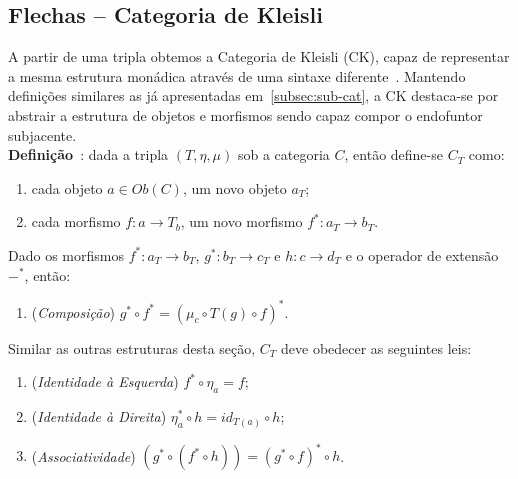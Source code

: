 \documentclass[10pt, conference]{IEEEtran}
\begin{document}
\subsection{Flechas -- Categoria de Kleisli}
\label{subsec:arrow}
A partir de uma tripla obtemos a Categoria de Kleisli (CK), capaz de representar a mesma estrutura monádica através de uma sintaxe diferente~\cite{hill1994introduction}. Mantendo definições similares as já apresentadas em~\ref{subsec:sub-cat}, a CK destaca-se por abstrair a estrutura de objetos e morfismos sendo capaz compor o endofuntor subjacente.\\

\textbf{Definição}~\cite{maclane1971mat, pedicchio2004categorical, hill1994introduction}: dada a tripla $(T, \eta, \mu)$ sob a categoria $C$, então define-se $C_T$ como:

\begin{enumerate}[label=(\alph*), leftmargin=3em, topsep = 0pt, itemsep = 1ex, partopsep = 1ex, parsep = 1ex]
	\item cada objeto $a \in Ob(C)$, um novo objeto $a_T$;
	\item cada morfismo $f: a \rightarrow T_b$, um novo morfismo ${f^*: a_T \rightarrow b_T}$.
\end{enumerate}

\bigskip

Dado os morfismos ${f^*: a_T \rightarrow b_T}$, $g^*: b_T \rightarrow c_T$ e ${h: c \rightarrow d_T}$ e o operador de extensão $-^*$, então:

\begin{enumerate}[label={}, leftmargin = 2em, topsep = 0pt, itemsep = 1ex,partopsep = 1ex, parsep = 1ex]
	\item (\textit{Composição}) $g^* \circ f^* = (\mu_c \circ T(g) \circ f)^*$.
\end{enumerate}

\bigskip

Similar as outras estruturas desta seção, $C_T$ deve obedecer as seguintes leis:

\begin{enumerate}[label={}, leftmargin = 2em, topsep = 0pt, itemsep = 1ex,partopsep = 1ex, parsep = 1ex]
	\item (\textit{Identidade à Esquerda}) $f^* \circ \eta_a = f$;
	\item (\textit{Identidade à Direita}) $\eta^*_a \circ h = id_{T(a)} \circ h$;
	\item (\textit{Associatividade}) $(g^* \circ (f^* \circ h)) = (g^* \circ f)^* \circ h$.
\end{enumerate}
\end{document}
